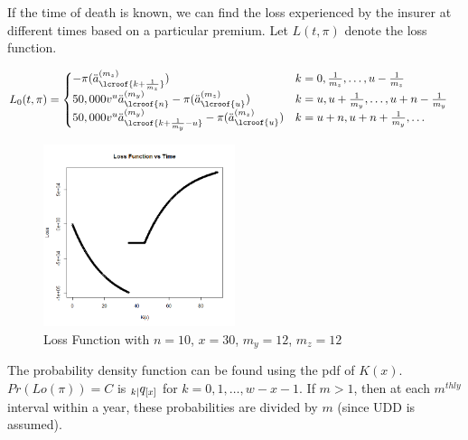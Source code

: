 \documentclass[12pt]{article}
\begin{document}
If the time of death is known, we can find the loss experienced by the insurer at different times based on a particular premium. Let $L(t,\pi)$ denote the loss function.

\begin{align*}
L_{0}(t,\pi) &= 
\begin{cases}
-\pi(\ddot{a}_{\lcroof{k+\frac{1}{m_z}}}^{(m_z)}) & k=0,\frac{1}{m_z},\dots{}, u-\frac{1}{m_z} \\
50,000v^u \ddot{a}_{\lcroof{n}}^{(m_y)} - \pi(\ddot{a}_{\lcroof{u}}^{(m_z)}) & k=u,u+\frac{1}{m_y},\dots{},u+n-\frac{1}{m_y} \\
50,000v^u \ddot{a}_{\lcroof{k+\frac{1}{m_y}-u}}^{(m_y)} - \pi(\ddot{a}_{\lcroof{u}}^{(m_z)}) & k = u+n,u+n+\frac{1}{m_y}, \dots{}
\end{cases}
\end{align*}

\begin{figure}[!ht]
\begin{center}
\includegraphics[width=0.5\textwidth]{images/lossFunction}
\end{center}
\vspace{-5mm}
\caption{Loss Function with $n=10$, $x=30$, $m_y=12$, $m_z=12$}
\label{figure:lossFunction}
\end{figure}

The probability density function can be found using the pdf of $K(x)$. $Pr(Lo(\pi))= C$ is $\hspace{0mm}_{k|}q_{[x]}$ for $k=0,1,\dots{},{w-x-1}$. If $m > 1 $, then at each $m^{thly}$ interval within a year, these probabilities are divided by $m$ (since UDD is assumed).
\end{document}

